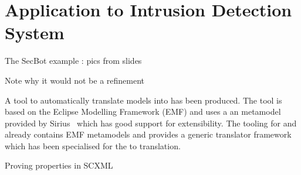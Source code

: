 
\section{Application to Intrusion Detection System}
\label{sec:example}
The SecBot example : pics from slides

Note why it would not be a refinement 

A tool to automatically translate \SCXML models into \iUMLB has been produced. The tool is based on the Eclipse Modelling Framework (EMF) and uses a an \SCXML metamodel provided by Sirius~\cite{siriuswebsite} which has good support for extensibility. The tooling for \iUMLB and \EventB already contains EMF metamodels and provides a generic translator framework which has been specialised for the \SCXML to \iUMLB translation.  

Proving properties in SCXML

